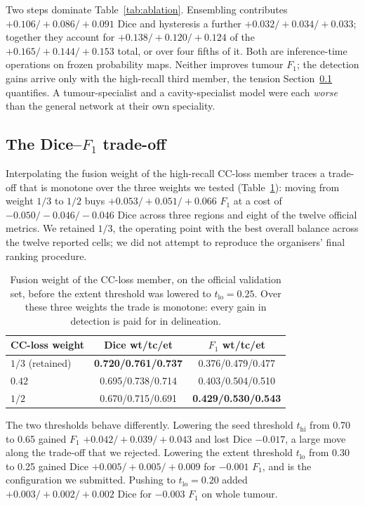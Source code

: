 \documentclass[runningheads]{llncs}
\begin{document}
Two steps dominate Table~\ref{tab:ablation}. Ensembling contributes $+0.106/+0.086/+0.091$ Dice
and hysteresis a further $+0.032/+0.034/+0.033$; together they account for $+0.138/+0.120/+0.124$
of the $+0.165/+0.144/+0.153$ total, or over four fifths of it. Both are inference-time operations
on frozen probability maps. Neither improves tumour $F_1$; the detection gains arrive only with
the high-recall third member, the tension Section~\ref{sec:frontier} quantifies. A
tumour-specialist and a cavity-specialist model were each \emph{worse} than the general network
at their own speciality.

\subsection{The Dice--$F_1$ trade-off}
\label{sec:frontier}

Interpolating the fusion weight of the high-recall CC-loss member traces a trade-off that is
monotone over the three weights we tested (Table~\ref{tab:frontier}): moving from weight $1/3$ to
$1/2$ buys $+0.053/+0.051/+0.066$ $F_1$ at a cost of $-0.050/-0.046/-0.046$ Dice across three
regions and eight of the twelve official metrics. We retained $1/3$, the operating point with the best
overall balance across the twelve reported cells; we did not attempt to reproduce the organisers'
final ranking procedure.

\begin{table}[t]
\centering
\caption{Fusion weight of the CC-loss member, on the official validation set, before the extent
threshold was lowered to $t_{\mathrm{lo}}=0.25$. Over these three weights the trade is monotone:
every gain in detection is paid for in delineation.}
\label{tab:frontier}
\begin{tabular}{@{}lcc@{}}
\toprule
CC-loss weight & Dice wt/tc/et & $F_1$ wt/tc/et \\
\midrule
$1/3$ (retained)  & \textbf{0.720/0.761/0.737} & 0.376/0.479/0.477 \\
$0.42$            & 0.695/0.738/0.714 & 0.403/0.504/0.510 \\
$1/2$             & 0.670/0.715/0.691 & \textbf{0.429/0.530/0.543} \\
\bottomrule
\end{tabular}
\end{table}

The two thresholds behave differently. Lowering the seed threshold $t_{\mathrm{hi}}$ from 0.70 to
0.65 gained $F_1$ $+0.042/+0.039/+0.043$ and lost Dice $-0.017$, a large move along the trade-off
that we rejected. Lowering the extent threshold $t_{\mathrm{lo}}$ from 0.30 to 0.25 gained Dice
$+0.005/+0.005/+0.009$ for $-0.001$ $F_1$, and is the configuration we submitted. Pushing to
$t_{\mathrm{lo}}=0.20$ added $+0.003/+0.002/+0.002$ Dice for $-0.003$ $F_1$ on whole tumour.
\end{document}
